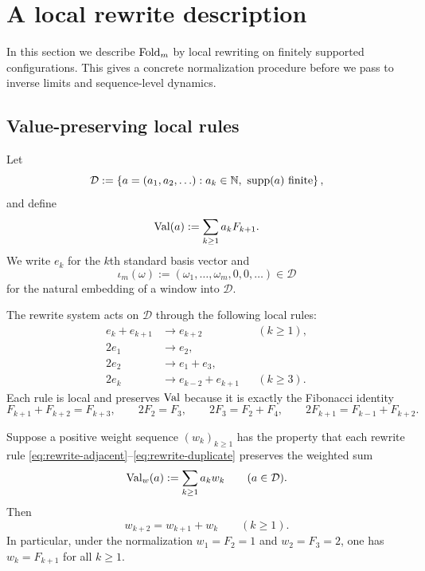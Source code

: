 \section{A local rewrite description}

In this section we describe $\operatorname{Fold}_m$ by local rewriting on finitely supported
configurations.  This gives a concrete normalization procedure before we pass
to inverse limits and sequence-level dynamics.

\subsection{Value-preserving local rules}

Let
\[
\mathcal D
:=
\left\{
a=(a_1,a_2,\ldots):
a_k\in\mathbb{N},\ \operatorname{supp}(a)\text{ finite}
\right\},
\]
and define
\[
\operatorname{Val}(a):=\sum_{k\ge 1} a_kF_{k+1}.
\]
We write $e_k$ for the $k$th standard basis vector and
\[
\iota_m(\omega):=(\omega_1,\ldots,\omega_m,0,0,\ldots)\in\mathcal D
\]
for the natural embedding of a window into $\mathcal D$.

The rewrite system acts on $\mathcal D$ through the following local rules:
\begin{align}
e_k+e_{k+1}&\longrightarrow e_{k+2} && (k\ge 1), \label{eq:rewrite-adjacent}\\
2e_1&\longrightarrow e_2, \label{eq:rewrite-base1}\\
2e_2&\longrightarrow e_1+e_3, \label{eq:rewrite-base2}\\
2e_k&\longrightarrow e_{k-2}+e_{k+1} && (k\ge 3). \label{eq:rewrite-duplicate}
\end{align}
Each rule is local and preserves $\operatorname{Val}$ because it is exactly the Fibonacci
identity
\[
F_{k+1}+F_{k+2}=F_{k+3},
\qquad
2F_2=F_3,
\qquad
2F_3=F_2+F_4,
\qquad
2F_{k+1}=F_{k-1}+F_{k+2}.
\]

\begin{lemma}
\label{lem:fold-local-weight-rigidity-fibonacci}
Suppose a positive weight sequence $(w_k)_{k\ge 1}$ has the property that each
rewrite rule \eqref{eq:rewrite-adjacent}--\eqref{eq:rewrite-duplicate}
preserves the weighted sum
\[
\operatorname{Val}_w(a):=\sum_{k\ge 1} a_kw_k
\qquad (a\in\mathcal D).
\]
Then
\[
w_{k+2}=w_{k+1}+w_k
\qquad (k\ge 1).
\]
In particular, under the normalization $w_1=F_2=1$ and $w_2=F_3=2$, one has
$w_k=F_{k+1}$ for all $k\ge 1$.
\end{lemma}

